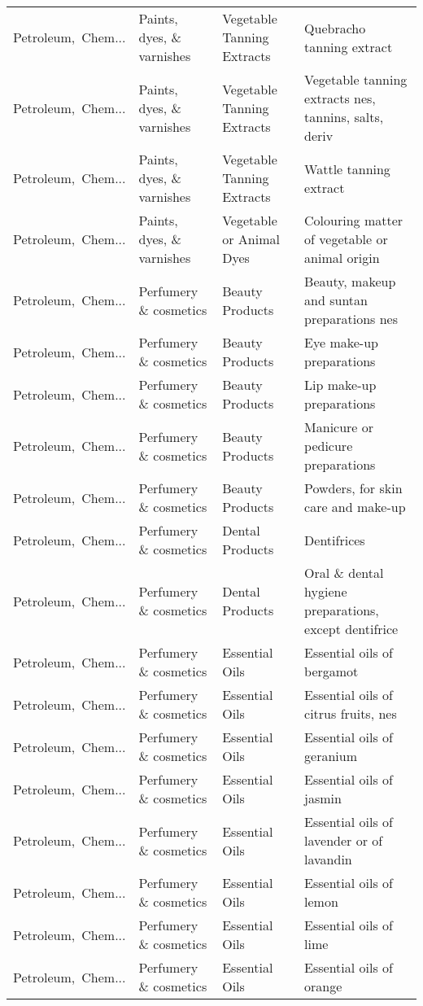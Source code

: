 \begin{appendices}
\begin{xltabular}{\textwidth}{|p{0.10\textwidth}|p{0.25\textwidth}|p{0.24\textwidth}|p{0.31\textwidth}|}
Petroleum,\ Chem... & Paints, dyes, \& varnishes & Vegetable Tanning Extracts & Quebracho tanning extract \\
Petroleum,\ Chem... & Paints, dyes, \& varnishes & Vegetable Tanning Extracts & Vegetable tanning extracts nes, tannins, salts, deriv \\
Petroleum,\ Chem... & Paints, dyes, \& varnishes & Vegetable Tanning Extracts & Wattle tanning extract \\
Petroleum,\ Chem... & Paints, dyes, \& varnishes & Vegetable or Animal Dyes & Colouring matter of vegetable or animal origin \\
Petroleum,\ Chem... & Perfumery \& cosmetics & Beauty Products & Beauty, makeup and suntan preparations nes \\
Petroleum,\ Chem... & Perfumery \& cosmetics & Beauty Products & Eye make-up preparations \\
Petroleum,\ Chem... & Perfumery \& cosmetics & Beauty Products & Lip make-up preparations \\
Petroleum,\ Chem... & Perfumery \& cosmetics & Beauty Products & Manicure or pedicure preparations \\
Petroleum,\ Chem... & Perfumery \& cosmetics & Beauty Products & Powders, for skin care and make-up \\
Petroleum,\ Chem... & Perfumery \& cosmetics & Dental Products & Dentifrices \\
Petroleum,\ Chem... & Perfumery \& cosmetics & Dental Products & Oral \& dental hygiene preparations, except dentifrice \\
Petroleum,\ Chem... & Perfumery \& cosmetics & Essential Oils & Essential oils of bergamot \\
Petroleum,\ Chem... & Perfumery \& cosmetics & Essential Oils & Essential oils of citrus fruits, nes \\
Petroleum,\ Chem... & Perfumery \& cosmetics & Essential Oils & Essential oils of geranium \\
Petroleum,\ Chem... & Perfumery \& cosmetics & Essential Oils & Essential oils of jasmin \\
Petroleum,\ Chem... & Perfumery \& cosmetics & Essential Oils & Essential oils of lavender or of lavandin \\
Petroleum,\ Chem... & Perfumery \& cosmetics & Essential Oils & Essential oils of lemon \\
Petroleum,\ Chem... & Perfumery \& cosmetics & Essential Oils & Essential oils of lime \\
Petroleum,\ Chem... & Perfumery \& cosmetics & Essential Oils & Essential oils of orange \\

\end{xltabular}
\end{appendices}
